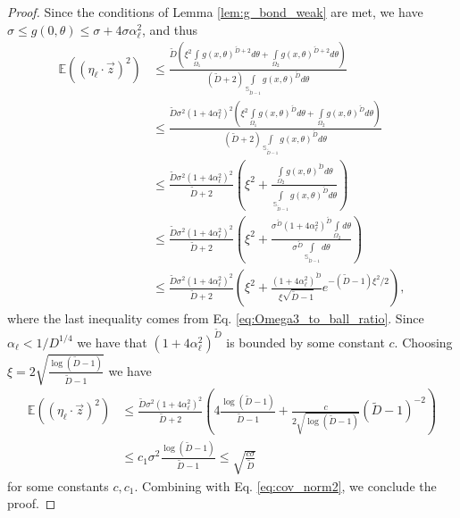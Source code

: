 \documentclass[12pt]{article}
\theoremstyle{remark}
\newcommand{\EE}{\mathbb{E}}
\newcommand{\wtilde}[1]{\widetilde{#1}}
\begin{document}
\begin{appendices}
\begin{proof}
Since the conditions of Lemma \ref{lem:g_bond_weak} are met, we have $\sigma \leq g(0,\theta)\leq \sigma + 4\sigma \alpha_\ell ^2$, and thus
\begin{align*}
\EE((\eta_\ell\cdot \vec{z})^2)
&\leq  \frac{\wtilde D\left(\xi^2 \int\limits_{\Omega_1} g(x,\theta)^{\wtilde D+2} d\theta + \int\limits_{\Omega_2} g(x,\theta)^{\wtilde D+2} d\theta\right)}{(\wtilde D+2)\int\limits_{\mathbb{S}_{\wtilde D-1}}g(x,\theta)^{\wtilde D} d\theta}
\\
&\leq  \frac{\wtilde D\sigma^2(1+4\alpha_\ell ^2)^2\left(\xi^2  \int\limits_{\Omega_1} g(x,\theta)^{\wtilde D} d\theta + \int\limits_{\Omega_2} g(x,\theta)^{\wtilde D} d\theta\right)}{(\wtilde D+2)\int\limits_{\mathbb{S}_{\wtilde D-1}}g(x,\theta)^{\wtilde D} d\theta}
\\
&\leq  \frac{\wtilde D\sigma^2(1+4\alpha_\ell ^2)^2}{\wtilde D+2}\left(\xi^2  +\frac{ \int\limits_{\Omega_2} g(x,\theta)^{\wtilde D} d\theta}{\int\limits_{\mathbb{S}_{\wtilde D-1}}g(x,\theta)^{\wtilde D} d\theta} \right)
\\
&\leq  \frac{\wtilde D\sigma^2(1+4\alpha_\ell ^2)^2}{\wtilde D+2}\left(\xi^2  +\frac{\sigma^{\wtilde D}(1+4\alpha_\ell ^2)^{\wtilde D} \int\limits_{\Omega_2} d\theta}{\sigma^{\wtilde D}\int\limits_{\mathbb{S}_{\wtilde D-1}} d\theta} \right)
\\
&\leq  \frac{\wtilde D\sigma^2(1+4\alpha_\ell ^2)^2}{\wtilde D+2}\left(\xi^2 +\frac{(1+4\alpha_\ell ^2)^{\wtilde D}}{\xi\sqrt{\wtilde D-1}} e^{-(\wtilde D-1)\xi^2/2}\right)
,\end{align*}
where the last inequality comes from Eq. \eqref{eq:Omega3_to_ball_ratio}.
Since $\alpha_\ell <1/D^{1/4}$ we have that $(1+4\alpha_\ell ^2)^{\wtilde D}$ is bounded by some constant $c$. Choosing $\xi = 2\sqrt{\frac{\log(\wtilde D-1)}{\wtilde D-1}}$ we have 
\begin{align*}
\EE((\eta_\ell\cdot \vec{z})^2)
&\leq  \frac{\wtilde D\sigma^2(1+4\alpha_\ell ^2)^2 }{\wtilde D+2}\left(4\frac{\log(\wtilde D-1)}{\wtilde D-1} +\frac{c}{2\sqrt{\log(\wtilde D-1)}} (\wtilde D-1)^{-2}\right)
\\
&\leq  c_1\sigma^2\frac{\log(\wtilde D-1)}{\wtilde D-1}\leq  \sqrt{\frac{c\sigma}{\wtilde D}}
\end{align*}
for some constants $c,c_1$. Combining with Eq. 
\eqref{eq:cov_norm2}, we conclude the proof.

\end{proof}



\end{appendices}
\end{document}
